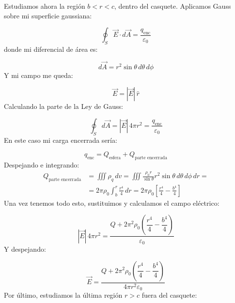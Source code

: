 \documentclass[a4paper,12pt]{article}
\begin{document}
\newpage
\noindent
Estudiamos ahora la región $b < r < c$, dentro del casquete.  
Aplicamos Gauss sobre mi superficie gaussiana:

\[
\oint_{S} \vec{E} \cdot d\vec{A} = \frac{q_{\text{enc}}}{\varepsilon_0}
\]
donde mi diferencial de área es:

\[
d\vec{A} = r^2 \sin\theta\, d\theta\, d\phi
\]
Y mi campo me queda:

\[
\vec{E} = |\vec{E}|\, \hat{r}
\]
Calculando la parte de la Ley de Gauss:

\[
\oint_{S} d\vec{A} = |\vec{E}|\, 4\pi r^2 = \frac{q_{\text{enc}}}{\varepsilon_0}
\]
En este caso mi carga encerrada sería:

\[
q_{\text{enc}} = Q_{\text{esfera}} + Q_{\text{parte encerrada}}
\]
Despejando e integrando:
\[
\begin{aligned}
Q_{\text{parte encerrada}} &= \iiint \rho_q\, dv = \iiint \frac{\rho_0 r}{\sin\theta} r^2 \sin\theta\, d\theta\, d\phi\, dr = \\[6pt]
&= 2\pi \rho_0 \int_{b}^{r} \frac{r^4}{4}\, dr = 2\pi \rho_0 \left[ \frac{r^4}{4} - \frac{b^4}{4} \right]
\end{aligned}
\]
Una vez tenemos todo esto, sustituimos y calculamos el campo eléctrico:

\[
|\vec{E}|\, 4\pi r^2 = \frac{Q + 2\pi^2 \rho_0 \left( \dfrac{r^4}{4} - \dfrac{b^4}{4} \right)}{\varepsilon_0}
\]
Y despejando:

\[
\vec{E} = \frac{Q + 2\pi^2 \rho_0 \left( \dfrac{r^4}{4} - \dfrac{b^4}{4} \right)}{4\pi r^2 \varepsilon_0}
\]
Por último, estudiamos la última región $r > c$ fuera del casquete:
\end{document}
